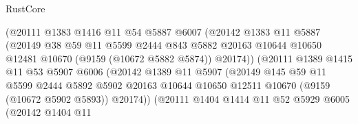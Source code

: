 \begin{lexlean}{RustCore}
\begin{coremodule}
                              (@20111
                                @1383
                                @1416
                                @11
                                @54
                                @5887
                                @6007
                                (@20142
                                  @1383
                                  @11
                                  @5887
                                  (@20149
                                    @38
                                    @59
                                    @11
                                    @5599
                                    @2444
                                    @843
                                    @5882
                                    @20163
                                    @10644
                                    @10650
                                    @12481
                                    @10670
                                    (@9159 (@10672 @5882 @5874))
                                    @20174))
                                (@20111
                                  @1389
                                  @1415
                                  @11
                                  @53
                                  @5907
                                  @6006
                                  (@20142
                                    @1389
                                    @11
                                    @5907
                                    (@20149
                                      @145
                                      @59
                                      @11
                                      @5599
                                      @2444
                                      @5892
                                      @5902
                                      @20163
                                      @10644
                                      @10650
                                      @12511
                                      @10670
                                      (@9159 (@10672 @5902 @5893))
                                      @20174))
                                  (@20111
                                    @1404
                                    @1414
                                    @11
                                    @52
                                    @5929
                                    @6005
                                    (@20142
                                      @1404
                                      @11

\end{coremodule}
\end{lexlean}
